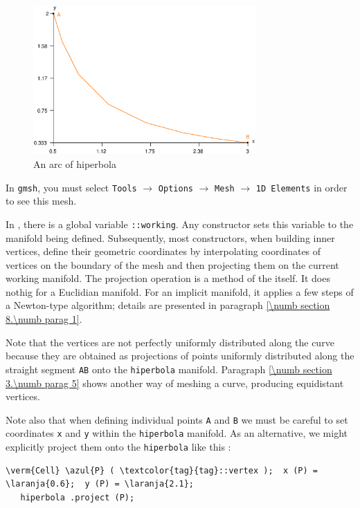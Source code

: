 \begin{figure}[ht] \centering
  \includegraphics[width=85mm]{hiperbola}
  \caption{An arc of hiperbola}
  \label{\numb section 2.\numb fig 4}
\end{figure}

In {\tt gmsh}, you must select {\small\tt Tools} $\to$ {\small\tt Options} $\to$
{\small\tt Mesh} $\to$ {\small\tt 1D Elements} in order to see this mesh.

In \maniFEM, there is a global variable {\small\tt{}::working}.
Any {\small\tt{}} constructor sets this variable to the manifold
being defined.
Subsequently, most {\small\tt{}} constructors, when building inner vertices,
define their geometric coordinates by interpolating coordinates of vertices on the
boundary of the mesh and then projecting them on the current working manifold.
The projection operation is a method of the {\small\tt{}} itself.
It does nothig for a Euclidian manifold.
For an implicit manifold, it applies a few steps of a Newton-type algorithm;
details are presented in paragraph \ref{\numb section 8.\numb parag 1}.

Note that the vertices are not perfectly uniformly distributed along the curve
because they are obtained as projections of points uniformly distributed along
the straight segment {\small\tt AB} onto the {\small\tt hiperbola} manifold.
Paragraph \ref{\numb section 3.\numb parag 5} shows another way of meshing a curve,
producing equidistant vertices.

Note also that when defining individual points {\small\tt A} and {\small\tt B} we must
be careful to set coordinates {\small\tt x} and {\small\tt y} within
the {\small\tt hiperbola} manifold.
As an alternative, we might explicitly project them onto the {\small\tt hiperbola} like this :

\begin{Verbatim}[commandchars=\\\{\},formatcom=\small\tt,baselinestretch=0.94]
   \verm{Cell} \azul{P} ( \textcolor{tag}{tag}::vertex );  x (P) = \laranja{0.6};  y (P) = \laranja{2.1};
   hiperbola .project (P);
\end{Verbatim}

